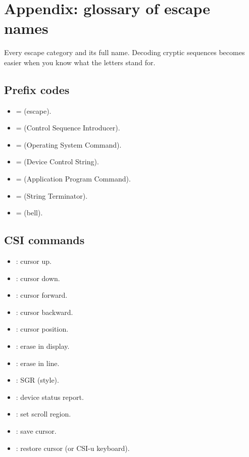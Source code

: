 \chapter{Appendix: glossary of escape names}
\label{ch:escglossary}

\begin{aside}
Every escape category and its full name. Decoding cryptic
sequences becomes easier when you know what the letters stand
for.
\end{aside}

\section{Prefix codes}

\begin{itemize}[leftmargin=*]
  \item {} =  (escape).
  \item {} = \code{ESC [} (Control Sequence
    Introducer).
  \item {} = \code{ESC ]} (Operating System
    Command).
  \item {} =  (Device Control String).
  \item {} =  (Application Program
    Command).
  \item {} =  (String
    Terminator).
  \item {} =  (bell).
\end{itemize}

\section{CSI commands}

\begin{itemize}[leftmargin=*]
  \item {}: cursor up.
  \item {}: cursor down.
  \item {}: cursor forward.
  \item {}: cursor backward.
  \item {}: cursor position.
  \item {}: erase in display.
  \item {}: erase in line.
  \item {}: SGR (style).
  \item {}: device status report.
  \item {}: set scroll region.
  \item {}: save cursor.
  \item {}: restore cursor (or CSI-u keyboard).
\end{itemize}

